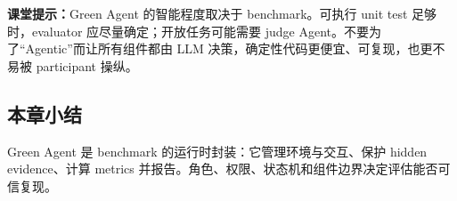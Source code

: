 \textbf{课堂提示：}Green Agent 的智能程度取决于 benchmark。可执行 unit test 足够时，evaluator 应尽量确定；开放任务可能需要 judge Agent。不要为了“Agentic”而让所有组件都由 LLM 决策，确定性代码更便宜、可复现，也更不易被 participant 操纵。

\subsection{本章小结}

Green Agent 是 benchmark 的运行时封装：它管理环境与交互、保护 hidden evidence、计算 metrics 并报告。角色、权限、状态机和组件边界决定评估能否可信复现。

